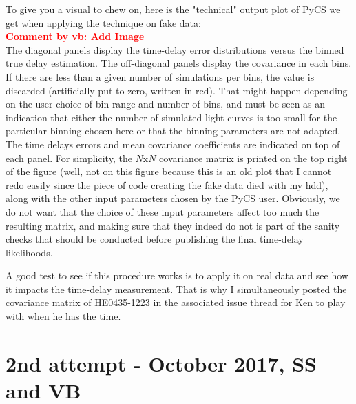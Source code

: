 \documentclass[11pt]{scrartcl}
\newcommand{\com}[2]{\xspace\textcolor{red}{\textbf{Comment by #1: #2}}}
\begin{document}
To give you a visual to chew on, here is the "technical" output plot of 
PyCS we get when applying the technique on fake data:\\

\com{vb}{Add Image}\\

The diagonal panels display the time-delay error distributions versus 
the binned true delay estimation. The off-diagonal panels display the 
covariance in each bins. If there are less than a given number of 
simulations per bins, the value is discarded (artificially put to zero, 
written in red). That might happen depending on the user choice of bin 
range and number of bins, and must be seen as an indication that either 
the number of simulated light curves is too small for the particular 
binning chosen here or that the binning parameters are not adapted. The 
time delays errors and mean covariance coefficients are indicated on 
top of each panel. For simplicity, the $N$x$N$ covariance matrix  
is printed on the top right of the figure (well, not on this figure 
because this is an old plot that I cannot redo easily since the piece 
of code creating the fake data died with my hdd), along with the 
other input parameters chosen by the PyCS user. Obviously, we do not 
want that the choice of these input parameters affect too much the 
resulting matrix, and making sure that they indeed do not is part of 
the sanity 
checks that should be conducted before publishing the final time-delay 
likelihoods.

A good test to see if this procedure works is to apply it on real data 
and see how it impacts the time-delay measurement. That is why I 
simultaneously posted the covariance matrix of HE0435-1223 in the 
associated issue thread for Ken to play with when he has the time. 


\section{2nd attempt - October 2017, SS and VB}
\end{document}
